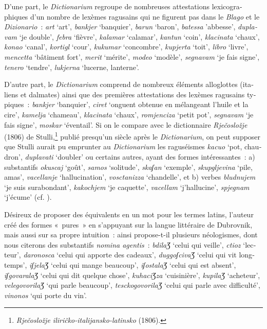\documentclass[output=paper,colorlinks,citecolor=brown,arabicfont,chinesefont,booklanguage=french]{langscibook}
\begin{document}
\begin{otherlanguage}{french}
D’une part, le \emph{Dictionarium} regroupe de nombreuses attestations lexicographiques d’un nombre de lexèmes ragusains qui ne figurent pas dans le \emph{Blago} et le \emph{Dizionario}~: \emph{art} ‘art’, \emph{bankjer} ‘banquier’, \emph{barun} ‘baron’, \emph{batessa}  'abbesse', \emph{duplavam} ‘je double’, \emph{febra} ‘fièvre’, \emph{kalamar} ‘calamar’, \emph{kantun} ‘coin’, \emph{klacinata} ‘chaux’, \emph{konao} ‘canal’, \emph{kortigl} ‘cour’, \emph{kukumar} ‘concombre’, \emph{kupjerta} ‘toit’, \emph{libro} ‘livre’, \emph{mencetta} ‘bâtiment fort’, \emph{merit} ‘mérite’, \emph{modeo} ‘modèle’, \emph{segnavam} ‘je fais signe’, \emph{tenero} ‘tendre’, \emph{lukjerna} ‘lucerne, lanterne’.

D’autre part, le \emph{Dictionarium} comprend de nombreux éléments alloglottes (italiens et dalmates) ainsi que des premières attestations des lexèmes ragusains typiques~: \emph{bankjer} ‘banquier’, \emph{ciret} ‘onguent obtenue en mélangeant l’huile et la cire’, \emph{kamelja} ‘chameau’, \emph{klacinata} ‘chaux’, \emph{romjenciza} ‘petit pot’, \emph{segnavam} ‘je fais signe’, \emph{moskar} ‘éventail’. Si on le compare avec le dictionnaire \emph{Rječosložje} (1806) de Stulli,\footnote{\emph{Rječosložje iliričko-italijansko-latinsko} (1806).}  publié presqu’un siècle après le \emph{Dictionarium}, on peut supposer que Stulli aurait pu emprunter au \emph{Dictionarium} les raguséismes \emph{kacuo} ‘pot, chaudron’, \emph{duplavati} ‘doubler’ ou certains autres, ayant des formes intéressantes~: a) substantifs \emph{okuscaj} ‘goût’, \emph{samos} ‘solitude’, \emph{skaʃan} ‘exemple’, \emph{skupgljevina} ‘pile, amas’, \emph{vacellanje} ‘hallucination’, \emph{vosctanizza} ‘chandelle’, et b) verbes \emph{bludnujem} ‘je suis surabondant’, \emph{kakochjem} ‘je caquette’, \emph{vacellam} ‘j’hallucine’, \emph{spjegnam} ‘j’écume’ (cf. \citealt{Franic2014}).

Désireux de proposer des équivalents en un mot pour les termes latins, l’auteur créé des formes «~pures~» en s’appuyant sur la langue littéraire de Dubrovnik, mais aussi sur sa propre intuition~: ainsi propose-t-il plusieurs néologismes, dont nous citerons des substantifs \emph{nomina agentis}~: \emph{bdilaƷ} ‘celui qui veille’, \emph{ctioz} ‘lecteur’, \emph{daronosca} ‘celui qui apporte des cadeaux’, \emph{duggoʃcivaƷ} ‘celui qui vit longtemps’, \emph{iʃjelaƷ} ‘celui qui mange beaucoup’, \emph{iʃostalaƷ} ‘celui qui est absent’, \emph{iʃgovaralaƷ} ‘celui qui dit quelque chose’, \emph{kuhaciƷza} ‘cuisinière’, \emph{kupilaƷ} ‘acheteur’, \emph{velegovorilaƷ} ‘qui parle beaucoup’, \emph{tesckogovorilaƷ} ‘celui qui parle avec difficulté’, \emph{vinonos} ‘qui porte du vin’. 


\end{otherlanguage}
\end{document}
